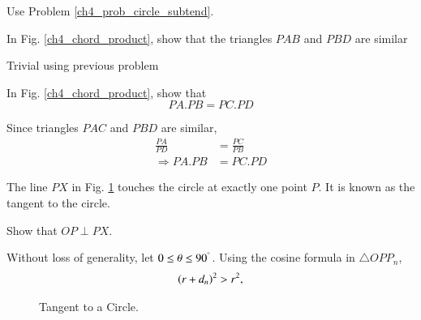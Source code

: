 %
%
\proof Use Problem \ref{ch4_prob_circle_subtend}.
%
\begin{problem}
	In Fig. \ref{ch4_chord_product}, show that the triangles $PAB$ and $PBD$ are similar
\end{problem}
\proof Trivial using previous problem
\begin{problem}
	In Fig. \ref{ch4_chord_product}, show that 
	\begin{equation}
	PA.PB = PC.PD
	\end{equation}
\end{problem}
%
\proof Since triangles $PAC$ and $PBD$ are similar, 
%
\begin{align}
\frac{PA}{PD} &= \frac{PC}{PB} \\
\Rightarrow PA.PB &= PC.PD
\end{align}
%
%
\begin{definition}
	The line $PX$ in Fig. \ref{ch4_tangent_def} touches the circle at exactly one  point $P$. It is known as the tangent to the circle.
\end{definition}
%
%
\begin{problem}
	Show that $OP \perp PX$.
\end{problem}
\proof Without loss of generality, let $0 \le \theta \le 90^{\degree}$. Using the cosine formula in $\triangle OPP_n$,\begin{align}
\left(r+d_n\right)^2 > r^2,
\end{align}
%
\begin{figure}[!ht]
	\begin{center}
		
		\resizebox{\columnwidth}{!}{}
	\end{center}
	\caption{Tangent to a Circle.}
	\label{ch4_tangent_def}	
\end{figure}
%
%		

